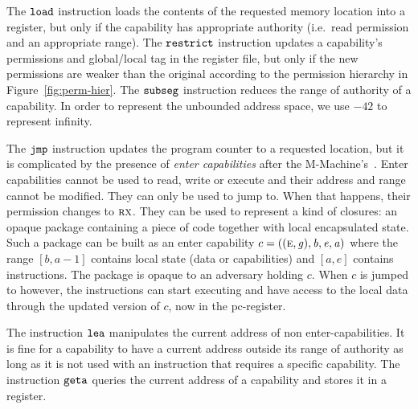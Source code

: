 \documentclass[format=acmsmall, review=true, screen=true]{acmart}
\renewcommand{\figurename}{Figure}
\newcommand\lau[1]{{\color{purple} \sf \footnotesize {LS: #1}}\\}
\newcommand\dominique[1]{{\color{purple} \sf \footnotesize {DD: #1}}\\}
\renewcommand\lau[1]{}
\renewcommand\dominique[1]{}
\newcommand{\var}[1]{\mathit{#1}}
\newcommand{\gl}{\var{g}}
\newcommand{\pcreg}{\mathrm{pc}}
\newcommand{\addr}{\var{a}}
\newcommand{\start}{\var{b}}
\newcommand{\addrend}{\var{e}}
\newcommand{\plainfun}[2]{
  \ifthenelse{\equal{#2}{}}
  {\mathit{#1}}
  {\mathit{#1}(#2)}
}
\newcommand{\decodePermPair}{\plainfun{decodePermPair}}
\newcommand{\zinstr}[1]{\mathtt{#1}}
\newcommand{\oneinstr}[2]{
  \ifthenelse{\equal{#2}{}}
  {\zinstr{#1}}
  {\zinstr{#1} \; #2}
}
\newcommand{\jmp}[1]{\oneinstr{jmp}{#1}}
\newcommand{\twoinstr}[3]{
  \ifthenelse{\equal{#2#3}{}}
  {\zinstr{#1}}
  {\zinstr{#1} \; #2 \; #3}
}
\newcommand{\restricttwo}[2]{\twoinstr{restrict}{#1}{#2}}
\newcommand{\geta}[2]{\twoinstr{geta}{#1}{#2}}
\newcommand{\load}[2]{\twoinstr{load}{#1}{#2}}
\newcommand{\lea}[2]{\twoinstr{lea}{#1}{#2}}
\newcommand{\threeinstr}[4]{
  \ifthenelse{\equal{#2#3#4}{}}
  {\zinstr{#1}}
  {\zinstr{#1} \; #2 \; #3 \; #4}
}
\newcommand{\subseg}[3]{\threeinstr{subseg}{#1}{#2}{#3}}
\newcommand{\plainperm}[1]{\textsc{#1}}
\newcommand{\exec}{\plainperm{rx}}
\newcommand{\entry}{\plainperm{e}}
\newcommand{\itoplassug}[1]{}
\begin{document}
\dominique{Follow order of figure in discussion?}
The $\load{}{}$ instruction loads the contents of the requested memory location
into a register, but only if the capability has appropriate authority (i.e.\
read permission and an appropriate range). The $\restricttwo{}{}$ instruction updates a
capability's permissions and global/local tag in the register file, but only if the new permissions are weaker than the original according to the permission hierarchy in \figurename~\ref{fig:perm-hier}. 
The $\subseg{}{}{}$ instruction reduces the range of authority of a capability.
In order to represent the unbounded address space, we use $-42$ to represent infinity.

The $\jmp{}$ instruction updates the program counter to a requested location,
but it is complicated by the presence of \emph{enter capabilities} 
after the M-Machine's~\citep{Carter:1994:HSF:195473.195579}. Enter capabilities
cannot be used to read, write or execute and their address and range cannot be
modified. They can only be used to jump to. When that happens, their
permission changes to $\exec$. They can be used to represent a kind of closures:
an opaque package containing a piece of code together with local encapsulated
state. Such a package can be built as an enter capability $c =
((\entry,\gl),\start,\addrend,\addr)$ where the range $[\start,\addr-1]$
contains local state (data or capabilities) and $[\addr,\addrend]$ contains
instructions. The package is opaque to an adversary holding $c$. When $c$ is
jumped to however, the instructions can start executing and have access to the local
data through the updated version of $c$, now in the $\pcreg$-register. 
\lau{As we talked about what is described here, is not how we make closures in
the TR, so we should consider whether we should refrain from using that word
here. }

The instruction $\lea{}{}$ manipulates the current address of non enter-capabilities.
It is fine for a capability to have a current address outside its range of authority as long as it is not used with an instruction that requires a specific capability.
The instruction $\geta{}{}$ queries the current address of a capability and stores it in a register.
\end{document}
